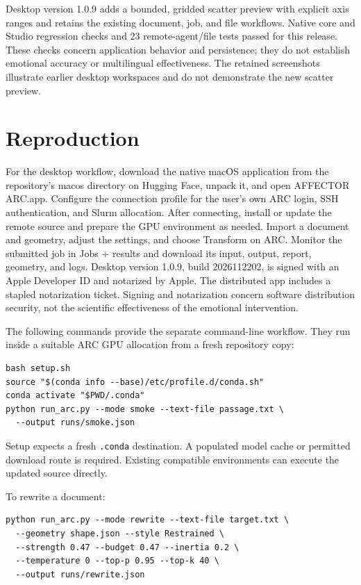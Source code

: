 \documentclass[manuscript,screen,nonacm]{acmart}
\begin{document}
Desktop version 1.0.9 adds a bounded, gridded scatter preview with explicit axis ranges and retains the existing document, job, and file workflows. Native core and Studio regression checks and 23 remote-agent/file tests passed for this release. These checks concern application behavior and persistence; they do not establish emotional accuracy or multilingual effectiveness. The retained screenshots illustrate earlier desktop workspaces and do not demonstrate the new scatter preview.

\section{Reproduction}\label{reproduction}

For the desktop workflow, download the native macOS application from the repository's macos directory on Hugging Face, unpack it, and open AFFECTOR ARC.app. Configure the connection profile for the user's own ARC login, SSH authentication, and Slurm allocation. After connecting, install or update the remote source and prepare the GPU environment as needed. Import a document and geometry, adjust the settings, and choose Transform on ARC. Monitor the submitted job in Jobs + results and download its input, output, report, geometry, and logs. Desktop version 1.0.9, build 2026112202, is signed with an Apple Developer ID and notarized by Apple. The distributed app includes a stapled notarization ticket. Signing and notarization concern software distribution security, not the scientific effectiveness of the emotional intervention.

The following commands provide the separate command-line workflow. They run inside a suitable ARC GPU allocation from a fresh repository copy:

\begin{verbatim}
bash setup.sh
source "$(conda info --base)/etc/profile.d/conda.sh"
conda activate "$PWD/.conda"
python run_arc.py --mode smoke --text-file passage.txt \
  --output runs/smoke.json
\end{verbatim}

Setup expects a fresh \nolinkurl{.conda} destination. A populated model
cache or permitted download route is required. Existing compatible
environments can execute the updated source directly.

To rewrite a document:

\begin{verbatim}
python run_arc.py --mode rewrite --text-file target.txt \
  --geometry shape.json --style Restrained \
  --strength 0.47 --budget 0.47 --inertia 0.2 \
  --temperature 0 --top-p 0.95 --top-k 40 \
  --output runs/rewrite.json
\end{verbatim}
\end{document}
